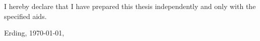 \vspace*{\fill}

\noindent
I hereby declare that I have prepared this thesis independently and only with the specified aids.

\vspace{2cm}
\noindent
Erding, \today, 

\vspace{0.5cm}